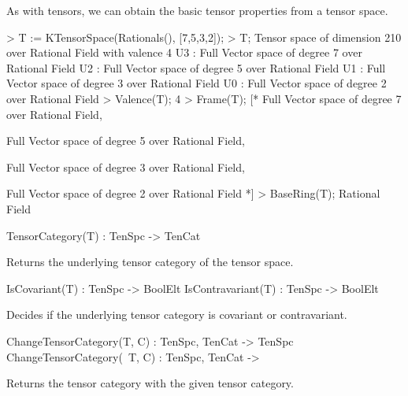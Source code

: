 \begin{example}[TenSpcProperties]

As with tensors, we can obtain the basic tensor properties from a tensor space.
\begin{code}
> T := KTensorSpace(Rationals(), [7,5,3,2]);
> T;
Tensor space of dimension 210 over Rational Field with valence 4
U3 : Full Vector space of degree 7 over Rational Field
U2 : Full Vector space of degree 5 over Rational Field
U1 : Full Vector space of degree 3 over Rational Field
U0 : Full Vector space of degree 2 over Rational Field
> Valence(T);
4
> Frame(T);
[*
    Full Vector space of degree 7 over Rational Field,

    Full Vector space of degree 5 over Rational Field,

    Full Vector space of degree 3 over Rational Field,

    Full Vector space of degree 2 over Rational Field
*]
> BaseRing(T);
Rational Field
\end{code}
\end{example}


\begin{intrinsics}
TensorCategory(T) : TenSpc -> TenCat
\end{intrinsics}

Returns the underlying tensor category of the tensor space.

\begin{intrinsics}
IsCovariant(T) : TenSpc -> BoolElt
IsContravariant(T) : TenSpc -> BoolElt
\end{intrinsics}

Decides if the underlying tensor category is covariant or contravariant.

\begin{intrinsics}
ChangeTensorCategory(T, C) : TenSpc, TenCat -> TenSpc
ChangeTensorCategory(~T, C) : TenSpc, TenCat -> 
\end{intrinsics}

Returns the tensor category with the given tensor category.

